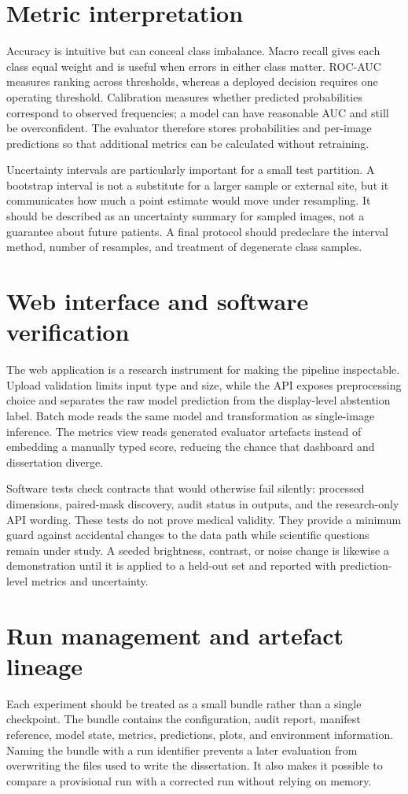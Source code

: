 \section{Metric interpretation}
Accuracy is intuitive but can conceal class imbalance. Macro recall gives each class equal weight and is useful when errors in either class matter. ROC-AUC measures ranking across thresholds, whereas a deployed decision requires one operating threshold. Calibration measures whether predicted probabilities correspond to observed frequencies; a model can have reasonable AUC and still be overconfident. The evaluator therefore stores probabilities and per-image predictions so that additional metrics can be calculated without retraining.

Uncertainty intervals are particularly important for a small test partition. A bootstrap interval is not a substitute for a larger sample or external site, but it communicates how much a point estimate would move under resampling. It should be described as an uncertainty summary for sampled images, not a guarantee about future patients. A final protocol should predeclare the interval method, number of resamples, and treatment of degenerate class samples.

\section{Web interface and software verification}
The web application is a research instrument for making the pipeline inspectable. Upload validation limits input type and size, while the API exposes preprocessing choice and separates the raw model prediction from the display-level abstention label. Batch mode reads the same model and transformation as single-image inference. The metrics view reads generated evaluator artefacts instead of embedding a manually typed score, reducing the chance that dashboard and dissertation diverge.

Software tests check contracts that would otherwise fail silently: processed dimensions, paired-mask discovery, audit status in outputs, and the research-only API wording. These tests do not prove medical validity. They provide a minimum guard against accidental changes to the data path while scientific questions remain under study. A seeded brightness, contrast, or noise change is likewise a demonstration until it is applied to a held-out set and reported with prediction-level metrics and uncertainty.

\section{Run management and artefact lineage}
Each experiment should be treated as a small bundle rather than a single checkpoint. The bundle contains the configuration, audit report, manifest reference, model state, metrics, predictions, plots, and environment information. Naming the bundle with a run identifier prevents a later evaluation from overwriting the files used to write the dissertation. It also makes it possible to compare a provisional run with a corrected run without relying on memory.

